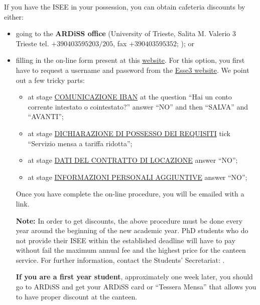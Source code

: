 \documentclass{sissavademecum}
\begin{document}
\noindent If you have the ISEE in your possession, you can obtain cafeteria discounts by either:
\begin{itemize}
    \item going to the \textbf{ARDiSS office} (University of Trieste,
    Salita M. Valerio 3 Trieste tel. $+390403595203/205$, fax $+390403595352$;
    ); or
    \item filling in the on-line form present at this \href{https://ardiss-ol.dirittoallostudio.it/istud/}{website}. For this option, you first have to request a username and password from the \href{https://esse3.units.it/Home.do}{Esse3 website}. We point out a few tricky parts:
    \begin{itemize}
    \item at stage \underline{COMUNICAZIONE IBAN} at the question ``Hai un conto corrente intestato o cointestato?'' answer ``NO'' and then ``SALVA'' and ``AVANTI'';
    \item at stage \underline{DICHIARAZIONE DI POSSESSO DEI REQUISITI} tick ``Servizio mensa a tariffa ridotta'';
    \item at stage \underline{DATI DEL CONTRATTO DI LOCAZIONE} answer ``NO'';
    \item at stage \underline{INFORMAZIONI PERSONALI AGGIUNTIVE} answer ``NO'';
\end{itemize}
Once you have complete the on-line procedure, you will be emailed with a link.

\textbf{Note:} In order to get discounts, the above procedure must be done every year around the beginning of the new academic year. PhD students who do not provide their ISEE within the established deadline will have to pay without fail the maximum annual fee and the highest price for the canteen service. For further information, contact the Students' Secretariat: .


\textbf{If you are a first year student}, approximately one week later, you should go to ARDiSS and get your ARDiSS card or ``Tessera Mensa'' that allows you to have proper discount at the canteen.
\end{itemize}
\end{document}
